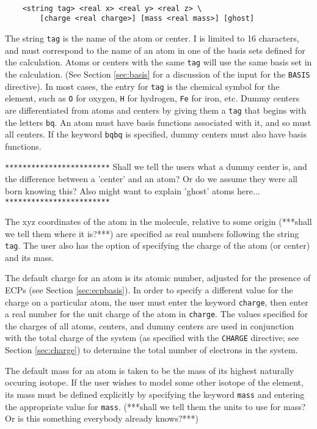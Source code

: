 \begin{verbatim}

    <string tag> <real x> <real y> <real z> \
        [charge <real charge>] [mass <real mass>] [ghost]

\end{verbatim}

The string \verb+tag+ is the name of the atom or center.  I is limited to
16 characters, and must correspond to the
name of an atom in one of the basis sets defined for the calculation.
Atoms or centers with the same \verb+tag+ will use the same basis set in
the calculation. 
(See Section \ref{sec:basis} for a discussion of the input for the
\verb+BASIS+ directive).  In most cases, the entry for \verb+tag+ is the
chemical symbol for the element, such as \verb+O+ for oxygen, \verb+H+
for hydrogen, \verb+Fe+ for iron, etc.  Dummy centers 
are differentiated from atoms and centers by giving them a \verb+tag+ that 
begins with the letters \verb+bq+.  An atom must have basis functions
associated with it, and so must all centers.  If the keyword \verb+bqbq+
is specified, dummy centers must also have basis functions.

\verb+************************+
Shall we tell the users what a dummy center is, and the difference
between a 'center' and an atom?  Or do we assume they were all born
knowing this?  Also might want to explain 'ghost' atoms here...
\verb+************************+

The xyz coordinates of the atom in the molecule, relative to some origin
(***shall we tell them where it is?***) are specified as real numbers 
following the string \verb+tag+.  The user also has the option of 
specifying the charge of the atom (or center) and its mass.  

The default charge for an
atom is its atomic number, adjusted for the presence of ECPs (see Section
\ref{sec:ecpbasis}).  In order to specify a different value for the
charge on a particular atom, the user must enter
the keyword \verb+charge+, then enter a real number for the unit charge
of the atom in \verb+charge+.  The values specified for the charges of 
all atoms, centers, and
dummy centers are used in conjunction with the 
total charge of the system (as specified with the \verb+CHARGE+ directive; 
see Section 
\ref{sec:charge}) to determine the total number of electrons in the system.

The default mass for an atom is taken to be the mass of its highest naturally
occuring isotope.  If the user wishes to model some other isotope of the
element, its mass must be defined explicitly by specifying the keyword 
\verb+mass+ and entering the appropriate value for \verb+mass+.  (***shall
we tell them the units to use for mass?  Or is this something everybody
already knows?***)


